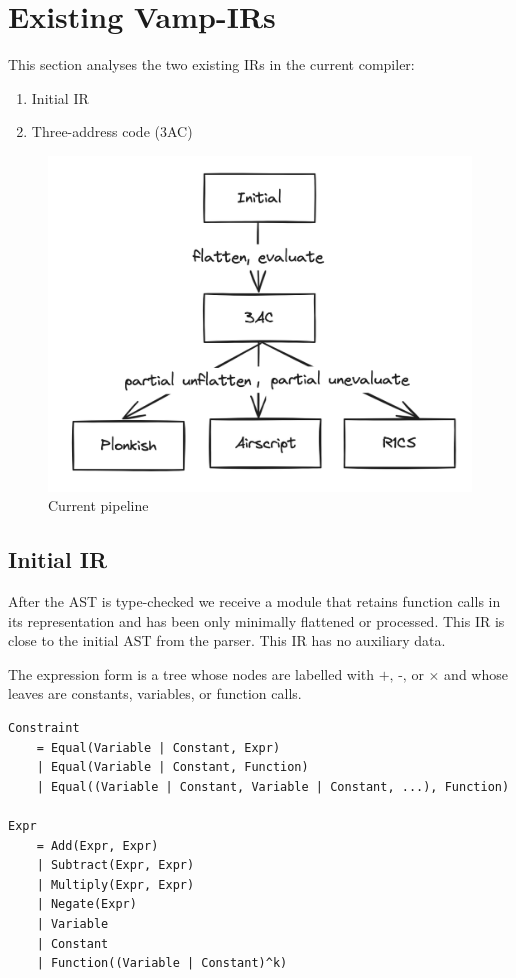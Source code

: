 \documentclass[
    9pt,            %
    techreport,        %
    affiltop,       %
]{art}
\begin{document}
\section{Existing Vamp-IRs}

This section analyses the two existing IRs in the current compiler:
\begin{enumerate}
    \item Initial IR
    \item Three-address code (3AC)
\end{enumerate}

\begin{figure}[H]
    \centering
    \includegraphics[width=0.5\linewidth]{current-pipeline.png}
    \caption{Current pipeline}
    \label{fig:enter-label}
\end{figure}

\subsection{Initial IR}

After the AST is type-checked we receive a module that retains function calls in its representation and has been only minimally flattened or processed. This IR is close to the initial AST from the parser. This IR has no auxiliary data.

The expression form is a tree whose nodes are labelled with $\text{+, -,}$ or $\times$ and whose leaves are constants, variables, or function calls.

\begin{verbatim}
Constraint
    = Equal(Variable | Constant, Expr)
    | Equal(Variable | Constant, Function)
    | Equal((Variable | Constant, Variable | Constant, ...), Function)
    
Expr 
    = Add(Expr, Expr) 
    | Subtract(Expr, Expr)
    | Multiply(Expr, Expr)
    | Negate(Expr)
    | Variable
    | Constant
    | Function((Variable | Constant)^k)
\end{verbatim}
\end{document}
